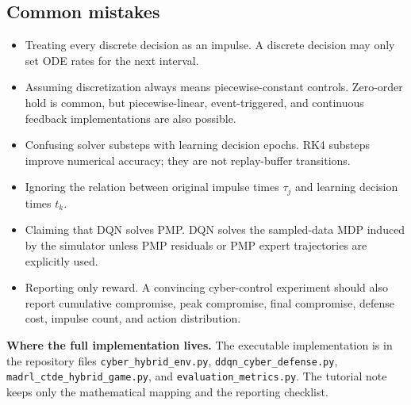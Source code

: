 \documentclass[11pt,a4paper]{article}
\begin{document}
\subsection{Common mistakes}
\begin{itemize}
\item Treating every discrete decision as an impulse. A discrete decision may only set ODE rates for the next interval.
\item Assuming discretization always means piecewise-constant controls. Zero-order hold is common, but piecewise-linear, event-triggered, and continuous feedback implementations are also possible.
\item Confusing solver substeps with learning decision epochs. RK4 substeps improve numerical accuracy; they are not replay-buffer transitions.
\item Ignoring the relation between original impulse times $\tau_j$ and learning decision times $t_k$.
\item Claiming that DQN solves PMP. DQN solves the sampled-data MDP induced by the simulator unless PMP residuals or PMP expert trajectories are explicitly used.
\item Reporting only reward. A convincing cyber-control experiment should also report cumulative compromise, peak compromise, final compromise, defense cost, impulse count, and action distribution.
\end{itemize}

\begin{boxednote}
\textbf{Where the full implementation lives.}
The executable implementation is in the repository files \texttt{cyber\_hybrid\_env.py}, \texttt{ddqn\_cyber\_defense.py}, \texttt{madrl\_ctde\_hybrid\_game.py}, and \texttt{evaluation\_metrics.py}.  The tutorial note keeps only the mathematical mapping and the reporting checklist.
\end{boxednote}
\end{document}
